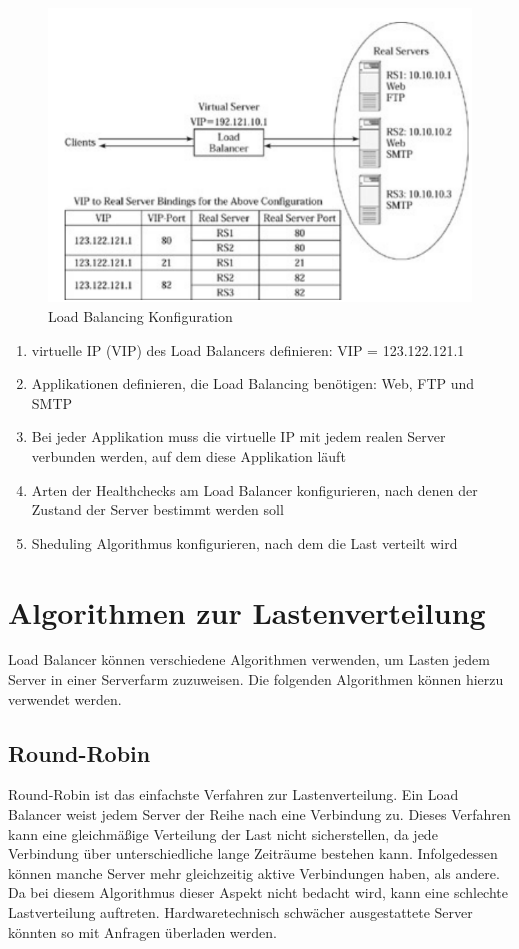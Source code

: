 \begin{figure}[!ht]
	\begin{center}
		\includegraphics[width=0.6\linewidth]{images/loadbalancing8.jpg}
		\caption{Load Balancing Konfiguration \cite{LoadBalancing2}}
		\label{Load Balancing Konfiguration}
	\end{center}
\end{figure}
\begin{enumerate}
\item virtuelle IP (VIP) des Load Balancers definieren: VIP = 123.122.121.1
\item Applikationen definieren, die Load Balancing benötigen: Web, FTP und SMTP
\item Bei jeder Applikation muss die virtuelle IP mit jedem realen Server verbunden werden, auf dem diese Applikation läuft
\item Arten der Healthchecks am Load Balancer konfigurieren, nach denen der Zustand der Server bestimmt werden soll
\item Sheduling Algorithmus konfigurieren, nach dem die Last verteilt wird \cite{LoadBalancing2}
\end{enumerate}

\section{Algorithmen zur Lastenverteilung}
\label{sec:Algorithmen zur Lastenverteilung}
Load Balancer können verschiedene Algorithmen verwenden, um Lasten jedem Server in einer Serverfarm zuzuweisen. Die folgenden Algorithmen können hierzu verwendet werden.

\subsection{Round-Robin}
\label{sec:Round-Robin}
Round-Robin ist das einfachste Verfahren zur Lastenverteilung.
Ein Load Balancer weist jedem Server der Reihe nach eine Verbindung zu.
Dieses Verfahren kann eine gleichmäßige Verteilung der Last nicht sicherstellen, da jede Verbindung über unterschiedliche lange Zeiträume bestehen kann. Infolgedessen können manche Server mehr gleichzeitig aktive Verbindungen haben, als andere. \cite{LoadBalancing2}
Da bei diesem Algorithmus dieser Aspekt nicht bedacht wird, kann eine schlechte Lastverteilung auftreten. Hardwaretechnisch schwächer ausgestattete Server könnten so mit Anfragen überladen werden.

